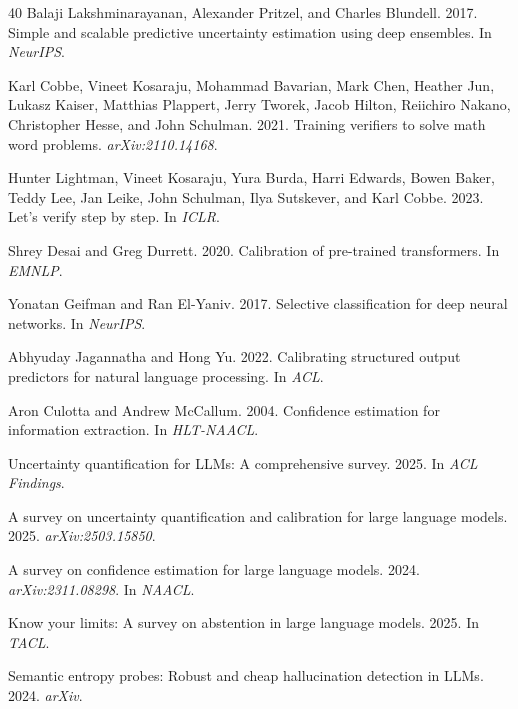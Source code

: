 \documentclass[11pt,a4paper]{article}
\begin{document}
\begin{thebibliography}{40}
Balaji Lakshminarayanan, Alexander Pritzel, and Charles Blundell. 2017.
Simple and scalable predictive uncertainty estimation using deep ensembles.
In \emph{NeurIPS}.

Karl Cobbe, Vineet Kosaraju, Mohammad Bavarian, Mark Chen, Heather Jun, Lukasz Kaiser, Matthias Plappert, Jerry Tworek, Jacob Hilton, Reiichiro Nakano, Christopher Hesse, and John Schulman. 2021.
Training verifiers to solve math word problems.
\emph{arXiv:2110.14168}.

Hunter Lightman, Vineet Kosaraju, Yura Burda, Harri Edwards, Bowen Baker, Teddy Lee, Jan Leike, John Schulman, Ilya Sutskever, and Karl Cobbe. 2023.
Let's verify step by step.
In \emph{ICLR}.

Shrey Desai and Greg Durrett. 2020.
Calibration of pre-trained transformers.
In \emph{EMNLP}.

Yonatan Geifman and Ran El-Yaniv. 2017.
Selective classification for deep neural networks.
In \emph{NeurIPS}.

Abhyuday Jagannatha and Hong Yu. 2022.
Calibrating structured output predictors for natural language processing.
In \emph{ACL}.

Aron Culotta and Andrew McCallum. 2004.
Confidence estimation for information extraction.
In \emph{HLT-NAACL}.

Uncertainty quantification for {LLMs}: A comprehensive survey. 2025.
In \emph{ACL Findings}.

A survey on uncertainty quantification and calibration for large language models. 2025.
\emph{arXiv:2503.15850}.

A survey on confidence estimation for large language models. 2024.
\emph{arXiv:2311.08298}. In \emph{NAACL}.

Know your limits: A survey on abstention in large language models. 2025.
In \emph{TACL}.

Semantic entropy probes: Robust and cheap hallucination detection in {LLMs}. 2024.
\emph{arXiv}.


\end{thebibliography}
\end{document}
